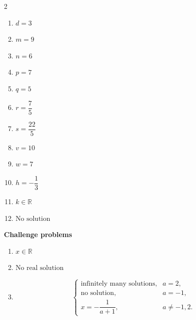 \begin{multicols}{2}
\begin{enumerate}[label=\textbf{\arabic*.},start=8]
			\item \(\boxed{d=3}\)
			
			\item \(\boxed{m=9}\)
			
			\item \(\boxed{n=6}\)
			
			\item \(\boxed{p=7}\)
			
			\item \(\boxed{q=5}\)
			
			\item \(\boxed{r=\dfrac{7}{5}}\)
			
			\item \(\boxed{s=\dfrac{22}{5}}\)
			
			\item \(\boxed{v=10}\)
			
			\item \(\boxed{w=7}\)
			
			\item \(\boxed{h=-\dfrac{1}{3}}\)
			
			\item \(\boxed{k\in\mathbb{R}}\)
			
			\item \(\boxed{\text{No solution}}\)
		\end{enumerate}
		
		\textbf{Challenge problems}
		
		\begin{enumerate}[label=\textbf{\arabic*.}]
			\item \(\boxed{x\in\mathbb{R}}\)
			
			\item \(\boxed{\text{No real solution}}\)
			
			\item \[
			\boxed{
				\begin{cases}
					\text{infinitely many solutions}, & a=2,\\[1mm]
					\text{no solution}, & a=-1,\\[1mm]
					x=-\dfrac{1}{a+1}, & a\neq -1,2.
				\end{cases}
			}
			\]
		\end{enumerate}
		
	\end{multicols}
	

